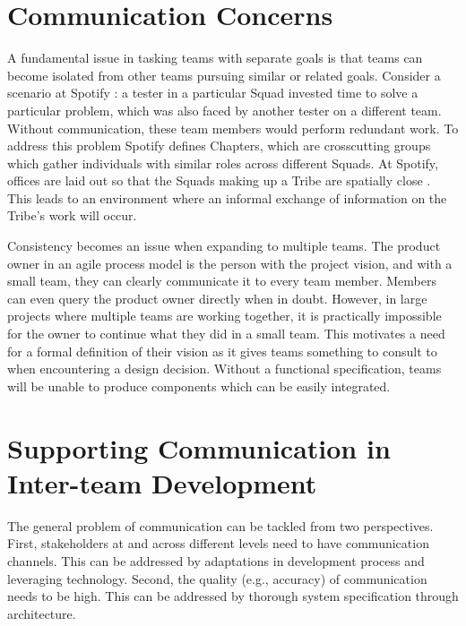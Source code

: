﻿\section{Communication Concerns}\label{sec:spt_ex} 
A fundamental issue in tasking teams with separate goals is that teams can become isolated from other teams pursuing similar or related goals.
Consider a scenario at Spotify \cite{kniberg12}: a tester in a particular Squad invested time to solve a particular problem, which was also faced by another tester on a different team. Without communication, these team members would perform redundant work.
To address this problem Spotify defines Chapters, which are crosscutting groups which gather individuals with similar roles across different Squads. 
At Spotify, offices are laid out so that the Squads making up a Tribe are spatially close \cite{kniberg12}.
This leads to an environment where an informal exchange of information on the Tribe's work will occur.

Consistency becomes an issue when expanding to multiple teams.
The product owner in an agile process model is the person with the project vision, and with a small team, they can clearly communicate it to every team member.
Members can even query the product owner directly when in doubt.
However, in large projects where multiple teams are working together, it is practically impossible for the owner to continue what they did in a small team.
This motivates a need for a formal definition of their vision as it gives teams something to consult to when encountering a design decision.
Without a functional specification, teams will be unable to produce components which can be easily integrated.

\section{Supporting Communication in Inter-team Development}
\label{sec:prop_appro} 
The general problem of communication can be tackled from two perspectives.
First, stakeholders at and across different levels need to have communication channels.
This can be addressed by adaptations in development process and leveraging technology.
Second, the quality (e.g., accuracy) of communication needs to be high.
This can be addressed by thorough system specification through architecture.

